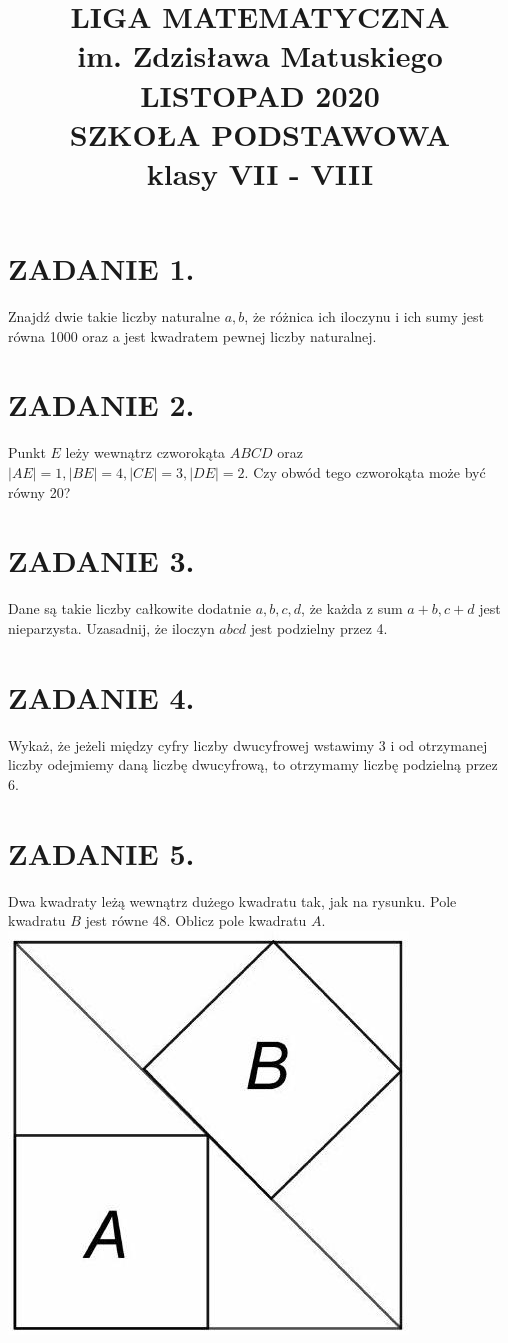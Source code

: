 \documentclass[10pt]{article}
\title{LIGA MATEMATYCZNA \\
 im. Zdzisława Matuskiego \\
 LISTOPAD 2020 \\
 SZKOŁA PODSTAWOWA \\
 klasy VII - VIII }
\author{}
\date{}
\begin{document}
\maketitle
\section*{ZADANIE 1.}
Znajdź dwie takie liczby naturalne \(a, b\), że różnica ich iloczynu i ich sumy jest równa 1000 oraz a jest kwadratem pewnej liczby naturalnej.

\section*{ZADANIE 2.}
Punkt \(E\) leży wewnątrz czworokąta \(A B C D\) oraz \(|A E|=1,|B E|=4,|C E|=3,|D E|=2\). Czy obwód tego czworokąta może być równy 20?

\section*{ZADANIE 3.}
Dane są takie liczby całkowite dodatnie \(a, b, c, d\), że każda z sum \(a+b, c+d\) jest nieparzysta. Uzasadnij, że iloczyn \(a b c d\) jest podzielny przez 4.

\section*{ZADANIE 4.}
Wykaż, że jeżeli między cyfry liczby dwucyfrowej wstawimy 3 i od otrzymanej liczby odejmiemy daną liczbę dwucyfrową, to otrzymamy liczbę podzielną przez 6.

\section*{ZADANIE 5.}
Dwa kwadraty leżą wewnątrz dużego kwadratu tak, jak na rysunku. Pole kwadratu \(B\) jest równe 48. Oblicz pole kwadratu \(A\).\\
\includegraphics[max width=\textwidth, center]{2024_11_21_a43ce92e94d9b555bf97g-1}
\end{document}
